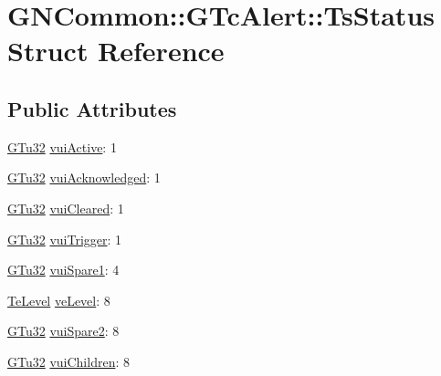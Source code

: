 \hypertarget{struct_g_n_common_1_1_g_tc_alert_1_1_ts_status}{}\section{G\+N\+Common\+:\+:G\+Tc\+Alert\+:\+:Ts\+Status Struct Reference}
\label{struct_g_n_common_1_1_g_tc_alert_1_1_ts_status}
\subsection*{Public Attributes}
\begin{DoxyCompactItemize}
\item 
\mbox{\hyperlink{namespace_g_n_common_ae5485474bc8f23e462e920a17b377b53}{G\+Tu32}} \mbox{\hyperlink{struct_g_n_common_1_1_g_tc_alert_1_1_ts_status_aa206fc59cb92b2cfeb34c5074b4abfe4}{vui\+Active}}\+: 1
\item 
\mbox{\hyperlink{namespace_g_n_common_ae5485474bc8f23e462e920a17b377b53}{G\+Tu32}} \mbox{\hyperlink{struct_g_n_common_1_1_g_tc_alert_1_1_ts_status_a5b40a0ae7eb67bf0348bddeebf858781}{vui\+Acknowledged}}\+: 1
\item 
\mbox{\hyperlink{namespace_g_n_common_ae5485474bc8f23e462e920a17b377b53}{G\+Tu32}} \mbox{\hyperlink{struct_g_n_common_1_1_g_tc_alert_1_1_ts_status_afb7934e444fdf241fd10a95a9888536d}{vui\+Cleared}}\+: 1
\item 
\mbox{\hyperlink{namespace_g_n_common_ae5485474bc8f23e462e920a17b377b53}{G\+Tu32}} \mbox{\hyperlink{struct_g_n_common_1_1_g_tc_alert_1_1_ts_status_ae6313a5a599b864766e2fc003051369b}{vui\+Trigger}}\+: 1
\item 
\mbox{\hyperlink{namespace_g_n_common_ae5485474bc8f23e462e920a17b377b53}{G\+Tu32}} \mbox{\hyperlink{struct_g_n_common_1_1_g_tc_alert_1_1_ts_status_a75cbc54d7ee85cf6b2a199909727c63a}{vui\+Spare1}}\+: 4
\item 
\mbox{\hyperlink{class_g_n_common_1_1_g_tc_alert_a9ef9363f62aae79a7323005ab126507e}{Te\+Level}} \mbox{\hyperlink{struct_g_n_common_1_1_g_tc_alert_1_1_ts_status_a5111d4b6b076f35d3877ea913fb48b2c}{ve\+Level}}\+: 8
\item 
\mbox{\hyperlink{namespace_g_n_common_ae5485474bc8f23e462e920a17b377b53}{G\+Tu32}} \mbox{\hyperlink{struct_g_n_common_1_1_g_tc_alert_1_1_ts_status_af954bf8fbb9e2de3ee236fbd8cd7fe24}{vui\+Spare2}}\+: 8
\item 
\mbox{\hyperlink{namespace_g_n_common_ae5485474bc8f23e462e920a17b377b53}{G\+Tu32}} \mbox{\hyperlink{struct_g_n_common_1_1_g_tc_alert_1_1_ts_status_ae0e02db40ef3f2a360ce4345400ab7c6}{vui\+Children}}\+: 8
\end{DoxyCompactItemize}



